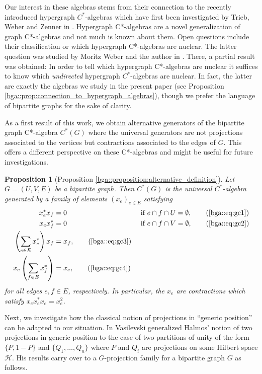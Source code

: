 \documentclass[a4paper]{amsart}
\newtheorem{introprop}[introthm]{Proposition}
\begin{document}
Our interest in these algebras stems from their connection to the recently introduced hypergraph $C^\ast$-algebras which have first been investigated by Trieb, Weber and Zenner in \cite{trieb_hypergraph_2024}. Hypergraph C*-algebras are a novel generalization of graph C*-algebras and not much is known about them. Open questions include their classification or which hypergraph C*-algebras are nuclear. The latter question was studied by Moritz Weber and the author in \cite{schafer_nuclearity_2024}. There, a partial result was obtained: In order to tell which hypergraph C*-algebras are nuclear it suffices to know which \emph{undirected} hypergraph $C^\ast$-algebras are nuclear. In fact, the latter are exactly the algebras we study in the present paper (see Proposition \ref{bga::prop:connection_to_hypergraph_algebras}), though we prefer the language of bipartite graphs for the sake of clarity.

As a first result of this work, we obtain alternative generators of the bipartite graph C*-algebra $C^\ast(G)$ where the universal generators are not projections associated to the vertices but contractions associated to the edges of $G$. This offers a different perspective on these C*-algebras and might be useful for future investigations.

\begin{introprop}[Proposition \ref{bga::proposition:alternative_definition}]
  Let $G = (U, V, E)$ be a bipartite graph. Then $C^\ast(G)$ is the universal $C^\ast$-algebra generated by a family of elements $(x_e)_{e \in E}$ satisfying
  \begin{align}
      x_e^\ast x_f &= 0 & & \text{ if } e \cap f \cap U = \emptyset,  \tag{\ref{bga::eq:gc1}} \\
      x_e x_f^\ast &= 0 & & \text{ if } e \cap f \cap V = \emptyset,  \tag{\ref{bga::eq:gc2}} \\
      \left( \sum_{e \in E} x_e^\ast \right) x_f &= x_f,              \tag{\ref{bga::eq:gc3}} \\
      x_e \left( \sum_{f \in E} x_f^\ast \right) &= x_e,              \tag{\ref{bga::eq:gc4}}
  \end{align}
  for all edges $e, f \in E$, respectively. In particular, the $x_e$ are contractions which satisfy $x_e x_e^\ast x_e = x_e^2$.
\end{introprop}

Next, we investigate how the classical notion of projections in ``generic position'' can be adapted to our situation. In \cite{vasilevski_algebra_1981} Vasilevski generalized Halmos' notion of two projections in generic position to the case of two partitions of unity of the form $\{P, 1-P\}$ and $\{Q_1, \dots, Q_n\}$ where $P$ and $Q_i$ are projections on some Hilbert space $\mathcal{H}$. His results carry over to a $G$-projection family for a bipartite graph $G$ as follows.
\end{document}

